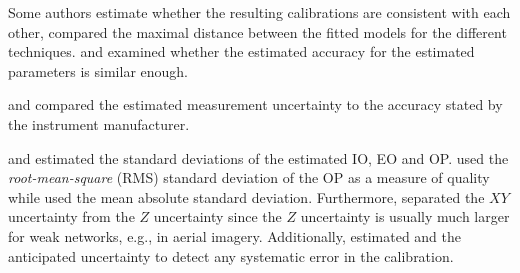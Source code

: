     Some authors estimate whether the resulting 
    calibrations are consistent with each other, 
    \citet{Rabbani2007:Integrated} compared the maximal distance between
    the fitted models for the different techniques.
    \citet{Dickscheid2008:benchmarking} and \citet{Labe2008:Quality}
    examined whether the estimated accuracy for the estimated parameters
    is similar enough.

    \citet{Rabbani2007:Integrated} and \citet{Fraser1995:Multi_sensor_self_calib} 
    compared the estimated measurement uncertainty to the accuracy stated by
    the instrument manufacturer.

    \citet{Fraser1995:Multi_sensor_self_calib} and \citet{Labe2008:Quality}
    estimated the standard deviations of the estimated IO, EO and OP.
    \citet{Fraser1995:Multi_sensor_self_calib} used the 
    \textit{root-mean-square} (RMS) standard deviation of the OP as a 
    measure of quality while \citet{Rabbani2007:Integrated} used the 
    mean absolute standard deviation.
    Furthermore, \citet{Fraser1995:Multi_sensor_self_calib} separated 
    the $XY$ uncertainty from the $Z$ uncertainty since the $Z$ uncertainty
    is usually much larger for weak networks, e.g., in aerial imagery.
    Additionally, \citet{Fraser1995:Multi_sensor_self_calib} 
    estimated and the anticipated uncertainty to detect any 
    systematic error in the calibration.
